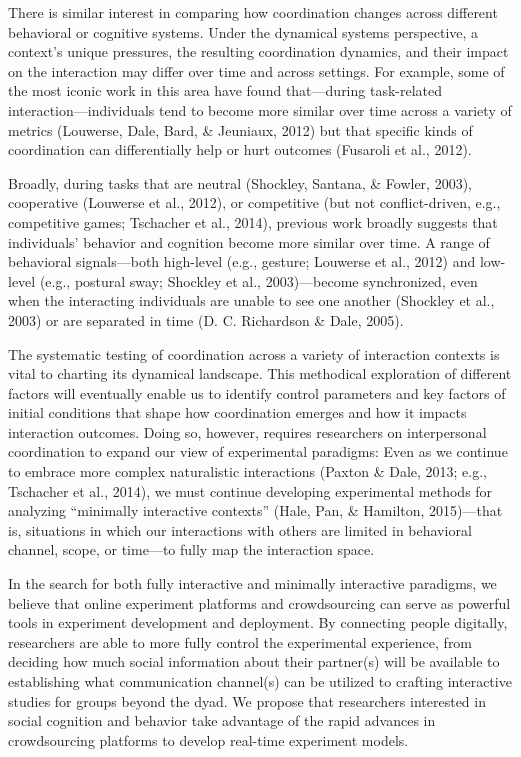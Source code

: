 \documentclass[10pt, letterpaper]{article}
\begin{document}
There is similar interest in comparing how coordination changes across
different behavioral or cognitive systems. Under the dynamical systems
perspective, a context's unique pressures, the resulting coordination
dynamics, and their impact on the interaction may differ over time and
across settings. For example, some of the most iconic work in this area
have found that---during task-related interaction---individuals tend to
become more similar over time across a variety of metrics (Louwerse,
Dale, Bard, \& Jeuniaux, 2012) but that specific kinds of coordination
can differentially help or hurt outcomes (Fusaroli et al., 2012).

Broadly, during tasks that are neutral (Shockley, Santana, \& Fowler,
2003), cooperative (Louwerse et al., 2012), or competitive (but not
conflict-driven, e.g., competitive games; Tschacher et al., 2014),
previous work broadly suggests that individuals' behavior and cognition
become more similar over time. A range of behavioral signals---both
high-level (e.g., gesture; Louwerse et al., 2012) and low-level (e.g.,
postural sway; Shockley et al., 2003)---become synchronized, even when
the interacting individuals are unable to see one another (Shockley et
al., 2003) or are separated in time (D. C. Richardson \& Dale, 2005).

The systematic testing of coordination across a variety of interaction
contexts is vital to charting its dynamical landscape. This methodical
exploration of different factors will eventually enable us to identify
control parameters and key factors of initial conditions that shape how
coordination emerges and how it impacts interaction outcomes. Doing so,
however, requires researchers on interpersonal coordination to expand
our view of experimental paradigms: Even as we continue to embrace more
complex naturalistic interactions (Paxton \& Dale, 2013; e.g., Tschacher
et al., 2014), we must continue developing experimental methods for
analyzing ``minimally interactive contexts'' (Hale, Pan, \& Hamilton,
2015)---that is, situations in which our interactions with others are
limited in behavioral channel, scope, or time---to fully map the
interaction space.

In the search for both fully interactive and minimally interactive
paradigms, we believe that online experiment platforms and crowdsourcing
can serve as powerful tools in experiment development and deployment. By
connecting people digitally, researchers are able to more fully control
the experimental experience, from deciding how much social information
about their partner(s) will be available to establishing what
communication channel(s) can be utilized to crafting interactive studies
for groups beyond the dyad. We propose that researchers interested in
social cognition and behavior take advantage of the rapid advances in
crowdsourcing platforms to develop real-time experiment models.
\end{document}
